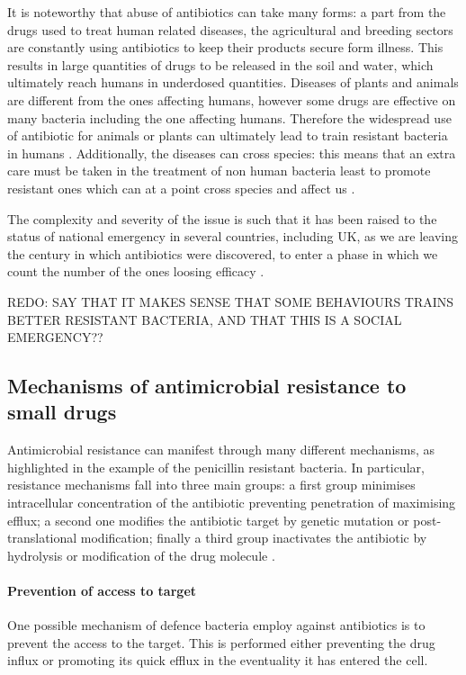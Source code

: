 It is noteworthy that abuse of antibiotics can take many forms: a part from the drugs used to treat human related diseases, the agricultural and breeding sectors are constantly using antibiotics to keep their products secure form illness. This results in large quantities of drugs to be released in the soil and water, which ultimately reach humans in underdosed quantities. Diseases of plants and animals are different from the ones affecting humans, however some drugs are effective on many bacteria including the one affecting humans. Therefore the widespread use of antibiotic for animals or plants can ultimately lead to train resistant bacteria in humans \cite{????}.
%
Additionally, the diseases can cross species: this means that an extra care must be taken in the treatment of non human bacteria least to promote resistant ones which can at a point cross species and affect us \cite{????}.

The complexity and severity of the issue is such that it has been raised to the status of national emergency in several countries, including UK, as we are leaving the century in which antibiotics were discovered, to enter a phase in which we count the number of the ones loosing efficacy \cite{Oneill2016}.

REDO: SAY THAT IT MAKES SENSE THAT SOME BEHAVIOURS TRAINS BETTER RESISTANT BACTERIA, AND THAT THIS IS A SOCIAL EMERGENCY??


\subsection{Mechanisms of antimicrobial resistance to small drugs} \label{sec:AMR_mechs}

Antimicrobial resistance can manifest through many different mechanisms, as highlighted in the example of the penicillin resistant bacteria.
%
In particular, resistance mechanisms fall into three main groups: a first group minimises intracellular concentration of the antibiotic preventing penetration of maximising efflux; a second one modifies the antibiotic target by genetic mutation or post-translational modification; finally a third group inactivates the antibiotic by hydrolysis or modification of the drug molecule \cite{Blair2014}.

\paragraph{Prevention of access to target}
One possible mechanism of defence bacteria employ against antibiotics is to prevent the access to the target. This is performed either preventing the drug influx or promoting its quick efflux in the eventuality it has entered the cell.

